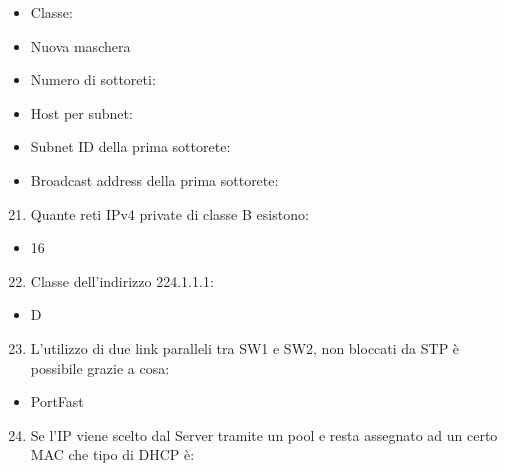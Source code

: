 \documentclass[
]{article}
\providecommand{\tightlist}{%
  \setlength{\itemsep}{0pt}\setlength{\parskip}{0pt}}
\begin{document}
\begin{itemize}
\tightlist
\item
  {Classe:}
\item
  {Nuova maschera}
\item
  {Numero di sottoreti:}
\item
  {Host per subnet:}
\item
  {Subnet ID della prima sottorete:}
\item
  {Broadcast address della prima sottorete:}
\end{itemize}

{}

\begin{enumerate}
\setcounter{enumi}{20}
\tightlist
\item
  {Quante reti IPv4 private di classe B esistono:}
\end{enumerate}

\begin{itemize}
\tightlist
\item
  {16}
\end{itemize}

{}

\begin{enumerate}
\setcounter{enumi}{21}
\tightlist
\item
  {Classe dell'indirizzo 224.1.1.1:}
\end{enumerate}

\begin{itemize}
\tightlist
\item
  {D}
\end{itemize}

{}

\begin{enumerate}
\setcounter{enumi}{22}
\tightlist
\item
  {L'utilizzo di due link paralleli tra SW1 e SW2, non bloccati da STP è
  possibile grazie a cosa:}
\end{enumerate}

\begin{itemize}
\tightlist
\item
  {PortFast}
\end{itemize}

{}

\begin{enumerate}
\setcounter{enumi}{23}
\tightlist
\item
  {Se l'IP viene scelto dal Server tramite un pool e resta assegnato ad
  un certo MAC che tipo di DHCP è:}
\end{enumerate}
\end{document}
